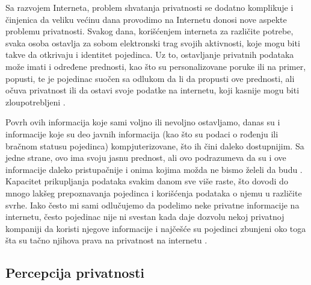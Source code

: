 \documentclass[a4paper]{article}
\begin{document}
Sa razvojem Interneta, problem shvatanja privatnosti se dodatno komplikuje i činjenica da veliku većinu dana provodimo na Internetu donosi nove aspekte problemu privatnosti. Svakog dana, korišćenjem interneta za različite potrebe, svaka osoba ostavlja za sobom elektronski trag svojih aktivnosti, koje mogu biti takve da otkrivaju i identitet pojedinca. Uz to, ostavljanje privatnih podataka može imati i određene prednosti, kao što su personalizovane poruke ili na primer, popusti, te je pojedinac suočen sa odlukom da li da propusti ove prednosti, ali očuva privatnost ili da ostavi svoje podatke na internetu, koji kasnije mogu biti zloupotrebljeni \cite{renata}.
\par Povrh ovih informacija koje sami voljno ili nevoljno ostavljamo, danas su i informacije koje su deo javnih informacija (kao što su podaci o rođenju ili bračnom statusu pojedinca) kompjuterizovane, što ih čini daleko dostupnijim. Sa jedne strane, ovo ima svoju jasnu prednost, ali ovo podrazumeva da su i ove informacije daleko pristupačnije i onima kojima možda ne bismo želeli da budu \cite{ethics}. Kapacitet prikupljanja podataka svakim danom sve više raste, što dovodi do mnogo lakšeg prepoznavanja pojedinca i korišćenja podataka o njemu u različite svrhe. Iako često mi sami odlučujemo da podelimo neke privatne informacije na internetu, često pojedinac nije ni svestan kada daje dozvolu nekoj privatnoj kompaniji da koristi njegove informacije i najčešće su pojedinci zbunjeni oko toga šta su tačno njihova prava na privatnost na internetu \cite{renata}.

\subsection{Percepcija privatnosti}
\label{subsec:percepcija}
\end{document}
